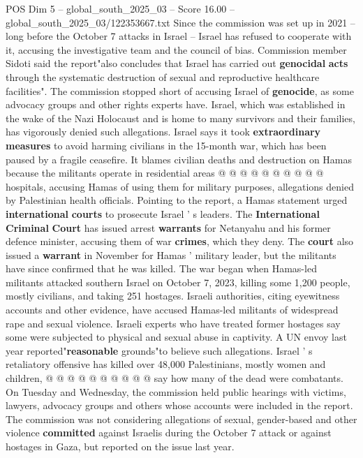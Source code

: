 \begin{textsample}{POS Dim 5 – global\_south\_2025\_03 – Score 16.00 – global\_south\_2025\_03/122353667.txt}
Since the commission was set up in 2021 -- long before the October 7 attacks in Israel -- Israel has refused to cooperate with it, accusing the investigative team and the council of bias.
Commission member Sidoti said the report"also concludes that Israel has carried out \textbf{genocidal} \textbf{acts} through the systematic destruction of sexual and reproductive healthcare facilities".
The commission stopped short of accusing Israel of \textbf{genocide}, as some advocacy groups and other rights experts have.
Israel, which was established in the wake of the Nazi Holocaust and is home to many survivors and their families, has vigorously denied such allegations.
Israel says it took \textbf{extraordinary} \textbf{measures} to avoid harming civilians in the 15-month war, which has been paused by a fragile ceasefire.
It blames civilian deaths and destruction on Hamas because the militants operate in residential areas @ @ @ @ @ @ @ @ @ @ hospitals, accusing Hamas of using them for military purposes, allegations denied by Palestinian health officials.
Pointing to the report, a Hamas statement urged \textbf{international} \textbf{courts} to prosecute Israel ' s leaders.
The \textbf{International} \textbf{Criminal} \textbf{Court} has issued arrest \textbf{warrants} for Netanyahu and his former defence minister, accusing them of war \textbf{crimes}, which they deny.
The \textbf{court} also issued a \textbf{warrant} in November for Hamas ' military leader, but the militants have since confirmed that he was killed.
The war began when Hamas-led militants attacked southern Israel on October 7, 2023, killing some 1,200 people, mostly civilians, and taking 251 hostages.
Israeli authorities, citing eyewitness accounts and other evidence, have accused Hamas-led militants of widespread rape and sexual violence.
Israeli experts who have treated former hostages say some were subjected to physical and sexual abuse in captivity.
A UN envoy last year reported"\textbf{reasonable} grounds"to believe such allegations.
Israel ' s retaliatory offensive has killed over 48,000 Palestinians, mostly women and children, @ @ @ @ @ @ @ @ @ @ say how many of the dead were combatants.
On Tuesday and Wednesday, the commission held public hearings with victims, lawyers, advocacy groups and others whose accounts were included in the report.
The commission was not considering allegations of sexual, gender-based and other violence \textbf{committed} against Israelis during the October 7 attack or against hostages in Gaza, but reported on the issue last year.

\end{textsample}
